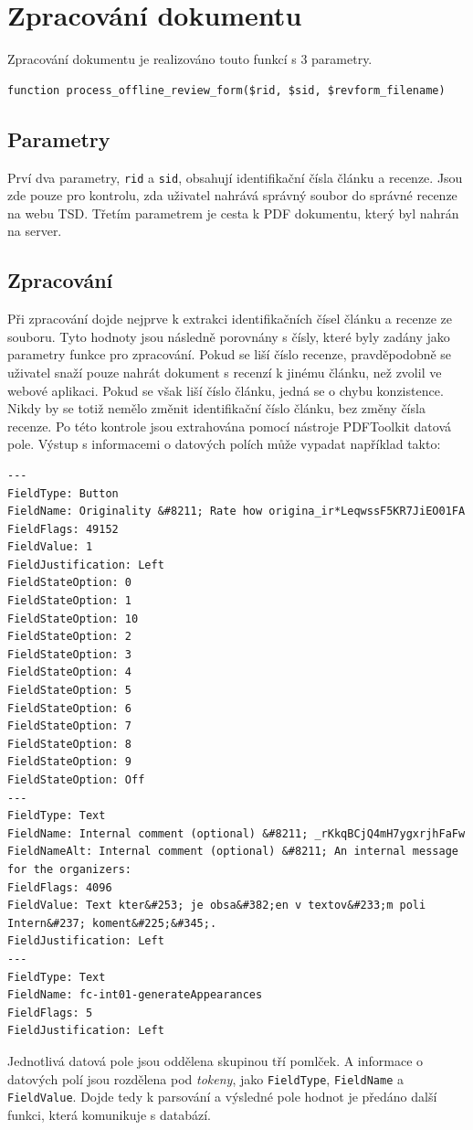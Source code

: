 \documentclass[czech,BP]{thesiskiv}
\begin{document}
\section{Zpracování dokumentu}
Zpracování dokumentu je realizováno touto funkcí s 3 parametry.
\begin{lstlisting}
function process_offline_review_form($rid, $sid, $revform_filename) 
\end{lstlisting}
\subsection{Parametry}
Prví dva parametry, \texttt{rid} a \texttt{sid}, obsahují identifikační čísla článku a recenze. Jsou zde pouze pro kontrolu, zda uživatel nahrává správný soubor do správné recenze na webu TSD. Třetím parametrem je cesta k PDF dokumentu, který byl nahrán na server.
\subsection{Zpracování}
Při zpracování dojde nejprve k extrakci identifikačních čísel článku a recenze ze souboru. Tyto hodnoty jsou následně porovnány s čísly, které byly zadány jako parametry funkce pro zpracování. Pokud se liší číslo recenze, pravděpodobně se uživatel snaží pouze nahrát dokument s recenzí k jinému článku, než zvolil ve webové aplikaci. Pokud se však liší číslo článku, jedná se o chybu konzistence. Nikdy by se totiž nemělo změnit identifikační číslo článku, bez změny čísla recenze. Po této kontrole jsou extrahována pomocí nástroje PDFToolkit datová pole. Výstup s informacemi o datových polích může vypadat například takto:
\label{vystup}
\begin{lstlisting}[basicstyle=\footnotesize,caption={Ukázka výstupu nástroje PDFToolkit},label={lst:vystup}]
---
FieldType: Button
FieldName: Originality &#8211; Rate how origina_ir*LeqwssF5KR7JiEO01FA
FieldFlags: 49152
FieldValue: 1
FieldJustification: Left
FieldStateOption: 0
FieldStateOption: 1
FieldStateOption: 10
FieldStateOption: 2
FieldStateOption: 3
FieldStateOption: 4
FieldStateOption: 5
FieldStateOption: 6
FieldStateOption: 7
FieldStateOption: 8
FieldStateOption: 9
FieldStateOption: Off
---
FieldType: Text
FieldName: Internal comment (optional) &#8211; _rKkqBCjQ4mH7ygxrjhFaFw
FieldNameAlt: Internal comment (optional) &#8211; An internal message for the organizers:
FieldFlags: 4096
FieldValue: Text kter&#253; je obsa&#382;en v textov&#233;m poli Intern&#237; koment&#225;&#345;.
FieldJustification: Left
---
FieldType: Text
FieldName: fc-int01-generateAppearances
FieldFlags: 5
FieldJustification: Left
\end{lstlisting}
Jednotlivá datová pole jsou oddělena skupinou tří pomlček. A informace o datových polí jsou rozdělena pod \emph{tokeny}, jako \texttt{FieldType}, \texttt{FieldName} a \texttt{FieldValue}. Dojde tedy k parsování a výsledné pole hodnot je předáno další funkci, která komunikuje s databází. 
\end{document}
